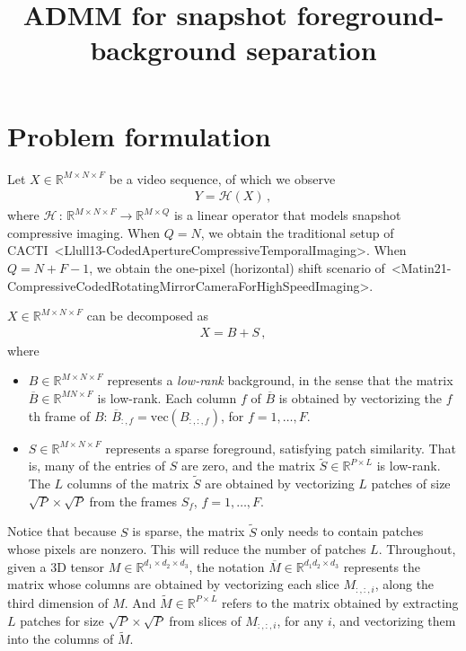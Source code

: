 \documentclass[a4paper,11pt]{article}
\title{ADMM for snapshot foreground-background separation}
\author{}
\date{}
\def\cite#1{<#1>}%
\begin{document}
\maketitle

\section{Problem formulation}

Let $X \in \mathbb{R}^{M\times N \times F}$ be a video sequence, of which
we observe
\begin{align}
	\label{eq:measurement}
	Y = \mathcal{H}(X)\,,
\end{align}
where $\mathcal{H}\,:\, \mathbb{R}^{M \times N \times F} \to \mathbb{R}^{M
		\times Q}$ is a linear operator that models snapshot compressive imaging. When
$Q = N$, we obtain the traditional setup of
CACTI~\cite{Llull13-CodedApertureCompressiveTemporalImaging}. When $Q = N + F
	-1$, we obtain the one-pixel (horizontal) shift scenario
of~\cite{Matin21-CompressiveCodedRotatingMirrorCameraForHighSpeedImaging}.

\begin{Assumption}
	$X \in \mathbb{R}^{M \times N\times F}$ can be decomposed as
	\begin{align}
		\label{eq:assumptionlowrankplussparse}
		X = B + S\,,
	\end{align}
	where
	\begin{itemize}
		\item $B \in \mathbb{R}^{M\times N\times F}$ represents a
		      \textit{low-rank} background, in the sense that the matrix
		      $\overline{B} \in \mathbb{R}^{MN \times F}$ is low-rank. Each column $f$
		      of $\overline{B}$ is obtained by vectorizing the $f$th frame of
		      $B$: $\overline{B}_{:, f} = \text{vec}(B_{:, :, f})$, for $f
			      = 1,\ldots, F$.

		\item $S \in \mathbb{R}^{M\times N\times F}$ represents a sparse
		      foreground, satisfying patch similarity. That is, many of the entries of
		      $S$ are zero, and the matrix $\widetilde{S} \in \mathbb{R}^{P
				      \times L}$ is low-rank. The $L$ columns of the matrix $\widetilde{S}$ are obtained by
		      vectorizing $L$ patches of size $\sqrt{P}\times \sqrt{P}$ from the frames
		      $S_f$, $f = 1, \ldots, F$.
	\end{itemize}
\end{Assumption}

Notice that because $S$ is sparse, the matrix $\widetilde{S}$ only needs to
contain patches whose pixels are nonzero. This will reduce the number of
patches $L$. Throughout, given a 3D tensor $M \in \mathbb{R}^{d_1 \times d_2
	\times d_{3}}$, the notation $\overline{M} \in \mathbb{R}^{d_1 d_2 \times d_3}$
represents the matrix whose columns are obtained by vectorizing each slice
$M_{:, :, i}$, along the third dimension of $M$. And $\widetilde{M} \in
	\mathbb{R}^{P \times L}$ refers to the matrix obtained by extracting $L$
patches for size $\sqrt{P} \times \sqrt{P}$ from slices of $M_{:, :, i}$, for
any $i$, and vectorizing them into the columns of $\widetilde{M}$.
\end{document}
